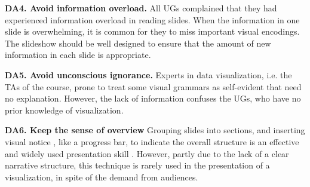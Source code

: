 \textbf{DA4. Avoid information overload.} 
All UGs complained that they had experienced information overload in reading slides. 
When the information in one slide is overwhelming, it is common for they to miss important visual encodings. 
The slideshow should be well designed to ensure that the amount of new information in each slide is appropriate. 

\textbf{DA5. Avoid unconscious ignorance.}
Experts in data visualization, i.e. the TAs of the course, prone to treat some visual grammars as self-evident that need no  explanation. However, the lack of information confuses the UGs, who have no prior knowledge of visualization. 

\textbf{DA6. Keep the sense of overview}
Grouping slides into sections, and inserting visual notice , like a progress bar, to indicate the overall structure is an effective and widely used presentation skill . However, partly due to the lack of a clear narrative structure, this technique is rarely used in the presentation of a visualization, in spite of the demand from audiences. 


